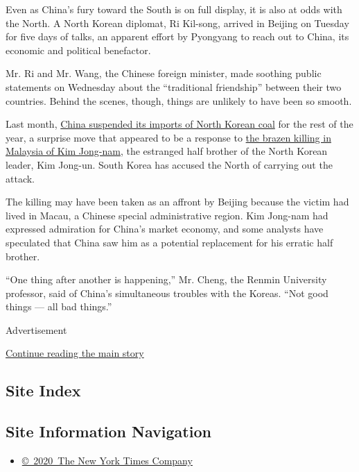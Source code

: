 Even as China's fury toward the South is on full display, it is also at
odds with the North. A North Korean diplomat, Ri Kil-song, arrived in
Beijing on Tuesday for five days of talks, an apparent effort by
Pyongyang to reach out to China, its economic and political benefactor.

Mr. Ri and Mr. Wang, the Chinese foreign minister, made soothing public
statements on Wednesday about the ``traditional friendship'' between
their two countries. Behind the scenes, though, things are unlikely to
have been so smooth.

Last month,
\href{https://www.nytimes3xbfgragh.onion/2017/02/18/world/asia/north-korea-china-coal-imports-suspended.html}{China
suspended its imports of North Korean coal} for the rest of the year, a
surprise move that appeared to be a response to
\href{https://www.nytimes3xbfgragh.onion/2017/03/01/world/asia/malaysia-kim-jong-nam-embassy-immunity.html}{the
brazen killing in Malaysia of Kim Jong-nam}, the estranged half brother
of the North Korean leader, Kim Jong-un. South Korea has accused the
North of carrying out the attack.

The killing may have been taken as an affront by Beijing because the
victim had lived in Macau, a Chinese special administrative region. Kim
Jong-nam had expressed admiration for China's market economy, and some
analysts have speculated that China saw him as a potential replacement
for his erratic half brother.

``One thing after another is happening,'' Mr. Cheng, the Renmin
University professor, said of China's simultaneous troubles with the
Koreas. ``Not good things --- all bad things.''

Advertisement

\protect\hyperlink{after-bottom}{Continue reading the main story}

\hypertarget{site-index}{%
\subsection{Site Index}\label{site-index}}

\hypertarget{site-information-navigation}{%
\subsection{Site Information
Navigation}\label{site-information-navigation}}

\begin{itemize}
\tightlist
\item
  \href{https://help.nytimes3xbfgragh.onion/hc/en-us/articles/115014792127-Copyright-notice}{©~2020~The
  New York Times Company}
\end{itemize}

